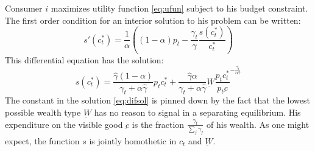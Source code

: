 \documentclass[12pt]{article}
\begin{document}
Consumer $i$ maximizes utility function \eqref{eq:ufun} subject to his budget constraint.  The first order condition for an interior solution to his problem can be written:
\begin{equation}
	\label{foc}
s'(c_t^*) = \frac{1}{\alpha}\left( \left( 1-\alpha\right) p_t - \frac{\gamma_t}{\hat{\gamma}}\frac{s(c_t^*)}{c_t^*}\right)
\end{equation}
This differential equation has the solution:
\begin{equation}
	\label{eq:difsol}
    s(c_t^*) = \frac{\hat{\gamma}\left(1-\alpha\right)}{\gamma_t +\alpha \hat{\gamma}} p_t c_t^* +  \frac{\hat{\gamma} \alpha }{\gamma_t + \alpha \hat{\gamma}} \underbar{W}\frac{p_t c_t^*}{p_t \underbar{c}}^{-\frac{\gamma_t}{\alpha \hat{\gamma}}}
\end{equation}
The constant in the solution \eqref{eq:difsol} is pinned down by the fact that the lowest possible wealth type $\underbar{W}$ has no reason to signal in a separating equilibrium.  His expenditure on the visible good $\underbar{c}$ is the fraction $\frac{\gamma_t}{\sum_j \gamma_j}$ of his wealth.  As one might expect, the function $s$ is jointly homothetic in $c_t$ and $\underbar{W}$.
\end{document}

